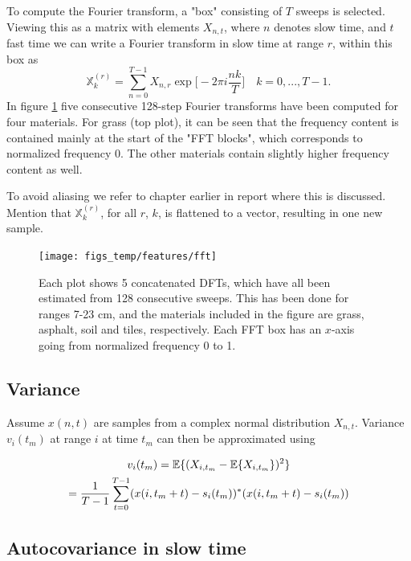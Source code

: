 To compute the Fourier transform, a "box" consisting of $T$ sweeps is selected. Viewing this as a matrix with elements $X_{n,t}$, where $n$ denotes slow time, and $t$ fast time we can write a Fourier transform in slow time at range $r$, within this box as
\begin{equation}
	\mathbb{X}_k^{(r)} = \sum_{n=0}^{T-1}X_{n,r}\exp\Big[-2\pi i\frac{nk}{T}\Big] \quad k=0, ..., T-1.
\end{equation}
In figure \ref{fig:fft} five consecutive 128-step Fourier transforms have been computed for four materials. For grass (top plot), it can be seen that the frequency content is contained mainly at the start of the "FFT blocks", which corresponds to normalized frequency 0. The other materials contain slightly higher frequency content as well.

To avoid aliasing we refer to chapter earlier in report where this is discussed. Mention that $\mathbb{X}_k^{(r)}$, for all $r$, $k$, is flattened to a vector, resulting in one new sample.

\begin{figure}[h]
	\centering
	\texttt{[image: figs\_temp/features/fft]}
	\caption{Each plot shows 5 concatenated DFTs, which have all been estimated from 128 consecutive sweeps. This has been done for ranges 7-23 cm, and the materials included in the figure are grass, asphalt, soil and tiles, respectively. Each FFT box has an $x$-axis going from normalized frequency 0 to 1.}
	\label{fig:fft}
\end{figure}




\subsection{Variance}

Assume $x(n,t)$ are samples from a complex normal distribution $X_{n,t}$. Variance $v_i(t_m)$ at range $i$ at time $t_m$ can then be approximated using

\begin{equation}
\label{eq:var}
\begin{gathered}
	v_i(t_m) = \operatorname*{\mathbb{E}}\{ (X_{i,t_m} - \operatorname*{\mathbb{E}}\{X_{i,t_m}\})^2\} \\
	= \frac{1}{T-1}\sum_{t=0}^{T-1}(x(i, t_m + t) - s_i(t_m))^*(x(i, t_m + t) -  s_i(t_m))
\end{gathered}
\end{equation}

\subsection{Autocovariance in slow time}

